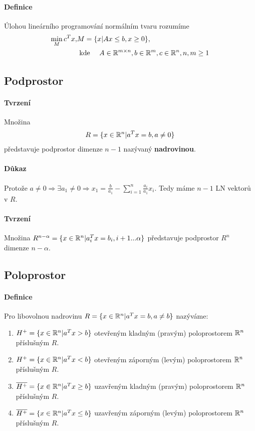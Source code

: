 \documentclass[a4paper,12pt,titlepage]{article}
\begin{document}
\paragraph{Definice}
Úlohou lineárního programování normálním tvaru rozumíme
\begin{align}
	\min_M c^T x, &M = \{ x | Ax \le b, x \ge 0 \}, \\
	&\text{ kde } \quad A \in \mathbb{R}^{m \times
	n }, b \in \mathbb{R}^m, c \in \mathbb{R}^n, n,m \ge 1
\end{align}
\subsection{Podprostor}
\setcounter{equation}{0}
\paragraph{Tvrzení}
Množina
\begin{align}
	R = \{ x \in \mathbb{R}^n | a^T x = b, a \neq 0 \}
\end{align}
představuje podprostor dimenze $n-1$ nazývaný \textbf{nadrovinou}.
\paragraph{Důkaz}
Protože $a \neq 0 \Rightarrow \exists a_1 \neq 0 \Rightarrow x_1 = \frac{b}{a_1}
- \sum_{i=1}^n \frac{a_i}{a_1} x_i$. Tedy máme $n-1$ LN vektorů v $R$.
\paragraph{Tvrzení} Množina $R^{n-\alpha} = \{ x \in \mathbb{R}^n | a_i^T x = b_i, i + 1
... \alpha \}$ představuje podprostor $R^n$ dimenze $n - \alpha$.

\subsection{Poloprostor}
\setcounter{equation}{0}
\paragraph{Definice}
Pro libovolnou nadrovinu $R = \{ x \in \mathbb{R}^n | a^T x = b, a \neq b \}$
nazýváme:
\begin{enumerate}
	\item $H^+ = \{ x \in \mathbb{R}^n | a^T x > b \}$ otevřeným kladným (pravým)
	poloprostorem $\mathbb{R}^n$ příslušným $R$.
	\item $H^+ = \{ x \in \mathbb{R}^n | a^T x < b \}$ otevřeným záporným (levým)
	poloprostorem $\mathbb{R}^n$ příslušným $R$.
	\item $\overline{H^+} = \{ x \in \mathbb{R}^n | a^T x \ge b \}$ uzavřeným kladným (pravým)
	poloprostorem $\mathbb{R}^n$ příslušným $R$.
	\item $\overline{H^+} = \{ x \in \mathbb{R}^n | a^T x \le b \}$ uzavřeným záporným (levým)
	poloprostorem $\mathbb{R}^n$ příslušným $R$.
\end{enumerate}
\end{document}
